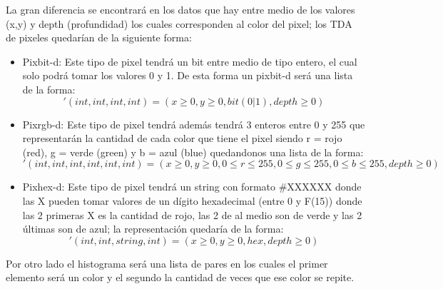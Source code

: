     La gran diferencia se encontrará en los datos que hay entre medio de los valores (x,y) y depth (profundidad)
    los cuales corresponden al color del pixel; 
    los TDA de pixeles quedarían de la siguiente forma:
    \begin{itemize}
        \item Pixbit-d: Este tipo de pixel tendrá un bit entre medio de tipo entero, el cual solo podrá 
        tomar los valores 0 y 1. De esta forma un pixbit-d será una lista de la forma:
        \begin{equation*}
            '(int, int, int, int) = (x \geq 0, y \geq 0, bit(0|1), depth \geq 0)
        \end{equation*}
        
        \item Pixrgb-d: Este tipo de pixel tendrá además tendrá 3 enteros entre 0 y 255 que representarán la 
        cantidad de cada color que tiene el pixel siendo r = rojo (red), g = verde (green) y b = azul (blue)
        quedandonos una lista de la forma:
        \begin{equation*}
            '(int, int, int, int, int, int) = (x \geq 0, y \geq 0, 0 \leq r \leq 255, 0 \leq g \leq 255, 0 \leq b \leq 255, depth \geq 0)
        \end{equation*}
        
        \item Pixhex-d: Este tipo de pixel tendrá un string con formato \#XXXXXX donde las X pueden tomar valores de un dígito hexadecimal (entre 0 y F(15))
        donde las 2 primeras X es la cantidad de rojo, las 2 de al medio son de verde y las 2 últimas son de azul; la representación quedaría de la forma:
        \begin{equation*}
            '(int, int, string, int) = (x \geq 0, y \geq 0, hex, depth \geq 0)
        \end{equation*}
    \end{itemize}

    Por otro lado el histograma será una lista de pares en los cuales el primer elemento será un color
    y el segundo la cantidad de veces que ese color se repite.
